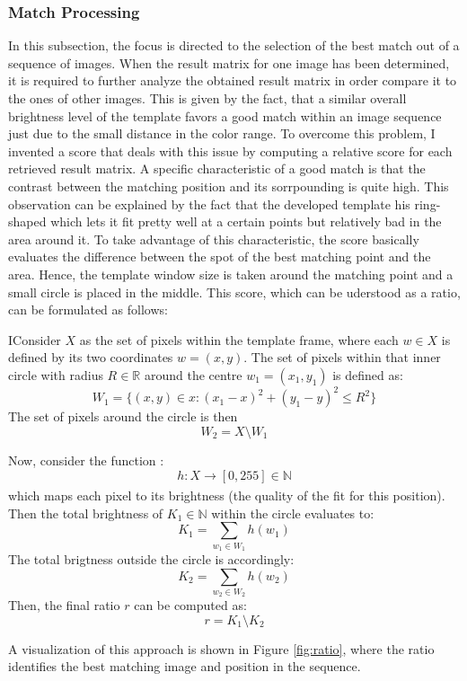 \documentclass[twoside,11pt]{article}
\begin{document}
\subsubsection{Match Processing}
\label{ratio}
In this subsection, the focus is directed to the selection of the best match out of a sequence of images. When the result matrix for one image has been determined, it is required to further analyze the obtained result matrix in order compare it to the ones of other images. This is given by the fact, that a similar overall brightness level of the template favors a good match within an image sequence just due to the small distance in the color range. To overcome this problem, I invented a score that deals with this issue by computing a relative score for each retrieved result matrix. A specific characteristic of a good match is that the contrast between the matching position and its sorrpounding is quite high. This observation can be explained by the fact that the developed template his ring-shaped which lets it fit pretty well at a certain points but relatively bad in the area around it. To take advantage of this characteristic, the score basically evaluates the difference between the spot of the best matching point and the area. Hence, the template window size is taken around the matching point and a small circle is placed in the middle. This score, which can be uderstood as a ratio, can be formulated as follows:

	IConsider $X$ as the set of pixels within the template frame, where each $ w \in X $ is defined by its two coordinates $w=(x,y)$. The set of pixels within that inner circle with radius $R \in \mathbb{R} $ around the centre $w_{1} = (x_{1},y_{1})$ is defined as:
	$$ W_{1} = \{ (x,y) \in x: (x_{1} - x )^2+(y_{1} - y )^2 \leq R^2 \} $$ 
	The set of pixels around the circle is then 
	$$ W_{2} = X\setminus W_{1} $$
	
	Now, consider the function :
	$$h:X\xrightarrow[]{} [0, 255] \in \mathbb{N}  $$
	which maps each pixel to its brightness (the quality of the fit for this position). Then the total brightness of $K_{1} \in \mathbb{N} $ within the circle evaluates to:
	$$ K_{1} = \sum_{w_{1} \in W_{1}} h(w_{1})$$
	The total brigtness outside the circle is accordingly:
	$$ K_{2} = \sum_{w_{2} \in W_{2}} h(w_{2})$$
	Then, the final ratio $r$ can be computed as:
	$$ r = K_{1}\setminus K_{2} $$
	
	A visualization of this approach is shown in Figure \ref{fig:ratio}, where the ratio identifies the best matching image and position in the sequence.
	
\end{document}
